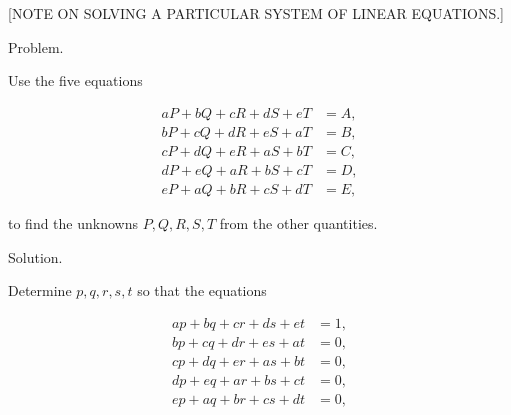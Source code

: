 \clearpage
{}

\begin{center}
\large [NOTE ON SOLVING A PARTICULAR SYSTEM
OF LINEAR EQUATIONS.]
\end{center}

\begin{center}
Problem.
\end{center}

\noindent\hspace*{\parindent}Use the five equations

\[
\begin{aligned}
aP + bQ + cR + dS + eT &= A,\\[3pt]
bP + cQ + dR + eS + aT &= B,\\[3pt]
cP + dQ + eR + aS + bT &= C,\\[3pt]
dP + eQ + aR + bS + cT &= D,\\[3pt]
eP + aQ + bR + cS + dT &= E,
\end{aligned}
\]

\noindent to find the unknowns $P, Q, R, S, T$ from the other quantities.

\begin{center}
Solution.
\end{center}

\noindent\hspace*{\parindent}Determine $p, q, r, s, t$ so that the equations

\[
\begin{aligned}
ap + bq + cr + ds + et &= 1,\\[3pt]
bp + cq + dr + es + at &= 0,\\[3pt]
cp + dq + er + as + bt &= 0,\\[3pt]
dp + eq + ar + bs + ct &= 0,\\[3pt]
ep + aq + br + cs + dt &= 0,
\end{aligned}
\]

